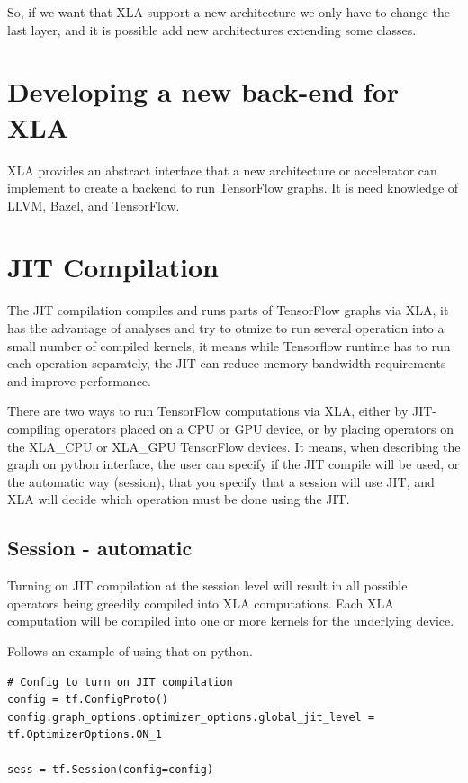\documentclass[11pt,openany]{book}
\begin{document}
So, if we want that XLA support a new architecture we only have to change the last layer, and it is possible add new architectures extending some classes.

\section{Developing a new back-end for XLA}

XLA provides an abstract interface that a new architecture or accelerator can implement to create a backend to run TensorFlow graphs. It is need knowledge of LLVM, Bazel, and TensorFlow.

\section{JIT Compilation}

The JIT compilation compiles and runs parts of TensorFlow graphs via XLA, it has the advantage of analyses and try to otmize to run several operation into a small number of compiled kernels, it means while Tensorflow runtime has to run each operation separately, the JIT can reduce memory bandwidth requirements and improve performance.

There are two ways to run TensorFlow computations via XLA, either by JIT-compiling operators placed on a CPU or GPU device, or by placing operators on the XLA\_CPU or XLA\_GPU TensorFlow devices. It means, when describing the graph on python interface, the user can specify if the JIT compile will be used, or the automatic way (session), that you specify that a session will use JIT, and XLA will decide which operation must be done using the JIT.

\subsection{Session - automatic}
Turning on JIT compilation at the session level will result in all possible operators being greedily compiled into XLA computations. Each XLA computation will be compiled into one or more kernels for the underlying device.

Follows an example of using that on python.

\begin{verbatim}
# Config to turn on JIT compilation
config = tf.ConfigProto()
config.graph_options.optimizer_options.global_jit_level = tf.OptimizerOptions.ON_1

sess = tf.Session(config=config)
\end{verbatim}
\end{document}
